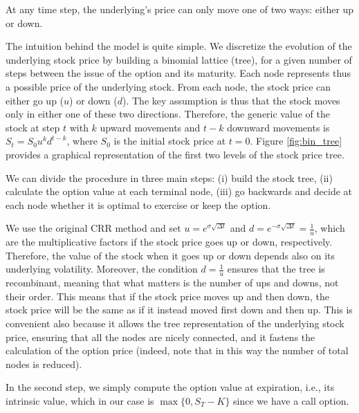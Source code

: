 \begin{assumption}
    \label{ass:bin_9}
    At any time step, the underlying's price can only move one of two ways: either up or down.
\end{assumption}

The intuition behind the model is quite simple. We discretize the evolution of the underlying stock price by building a binomial lattice (tree), for a given number of steps between the issue of the option and its maturity. Each node represents thus a possible price of the underlying stock. From each node, the stock price can either go up ($u$) or down ($d$). The key assumption is thus that the stock moves only in either one of these two directions. Therefore, the generic value of the stock at step $t$ with $k$ upward movements and $t-k$ downward movements is $S_t = S_0 u^k d^{t-k}$, where $S_0$ is the initial stock price at $t=0$. Figure \ref*{fig:bin_tree} provides a graphical representation of the first two levels of the stock price tree. 


We can divide the procedure in three main steps: (i) build the stock tree, (ii) calculate the option value at each terminal node, (iii) go backwards and decide at each node whether it is optimal to exercise or keep the option.

We use the original CRR method and set $u = e^{\sigma \sqrt{\Delta t}}$ and $d = e^{-\sigma \sqrt{\Delta t}}=\frac{1}{u}$, which are the multiplicative factors if the stock price goes up or down, respectively. Therefore, the value of the stock when it goes up or down depends also on its underlying volatility. Moreover, the condition $d = \frac{1}{u}$ ensures that the tree is recombinant, meaning that what matters is the number of ups and downs, not their order. This means that if the stock price moves up and then down, the stock price will be the same as if it instead moved first down and then up. This is convenient also because it allows the tree representation of the underlying stock price, ensuring that all the nodes are nicely connected, and it fastens the calculation of the option price (indeed, note that in this way the number of total nodes is reduced). 

In the second step, we simply compute the option value at expiration, i.e., its intrinsic value, which in our case is $\max \{0, S_T - K \}$ since we have a call option.

